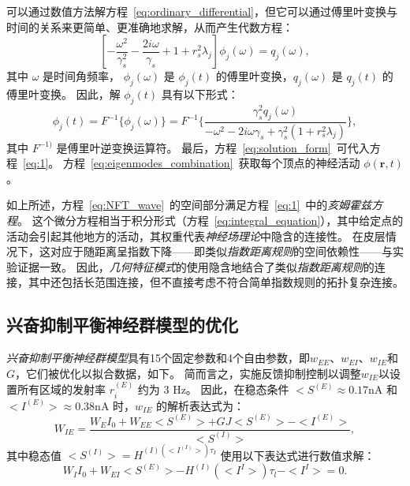 \documentclass[lang=cn,a4paper,newtx,citestyle=gb7714-2015, bibstyle=gb7714-2015]{elegantpaper}
\begin{document}
可以通过数值方法解方程~\ref{eq:ordinary_differential}，但它可以通过傅里叶变换与时间的关系来更简单、更准确地求解，从而产生代数方程：
%
\begin{equation}\label{eq:algebraic_equation}
	[
		- \frac{\omega ^2}{\gamma_s^2}
		- \frac{2 i \omega}{\gamma_s}
		+ 1
		+ r_s^2 \lambda_j
	]
	\phi_j(\omega)
	=
	q_j(\omega),
\end{equation}
%
其中 $ ω $ 是时间角频率， $ \phi_j (\omega) $ 是 $ \phi_j (t) $ 的傅里叶变换，$ q_j (\omega) $ 是 $ q_j (t) $ 的傅里叶变换。
因此，解 $ \phi_j (t) $ 具有以下形式：
%
\begin{equation}\label{eq:solution_form}
	\phi_j(t)
	=
	F^{-1} \{\phi_j(\omega)\}
	=
	F^{-1}
	\{
		\frac{
				\gamma_s^2 q_j(\omega)
			 }
		 	 {
		 	 	- \omega^2
		 	 	- 2 i \omega \gamma_s
		 	 	+ \gamma_s^2
		 	 		(1 + r_s^2 \lambda_j)
		 	 }
	\},
\end{equation}
%
其中 $ F^{-1)} $ 是傅里叶逆变换运算符。
最后，方程~\ref{eq:solution_form}~可代入方程~\ref{eq:1}。
方程~\ref{eq:eigenmodes_combination}~获取每个顶点的神经活动 $ \phi(\boldsymbol{r},t) $。



如上所述，方程~\ref{eq:NFT_wave}~的空间部分满足方程~\ref{eq:1}~中的\textit{亥姆霍兹方程}。
这个微分方程相当于积分形式（方程~\ref{eq:integral_equation}），其中给定点的活动会引起其他地方的活动，其权重代表\textit{神经场理论}中隐含的连接性。
在皮层情况下，这对应于随距离呈指数下降——即类似\textit{指数距离规则}的空间依赖性——与实验证据\cite{robinson1997propagation}一致。
因此，\textit{几何特征模式}的使用隐含地结合了类似\textit{指数距离规则}的连接，其中还包括长范围连接，但不直接考虑不符合简单指数规则的拓扑复杂连接。



\subsection{兴奋抑制平衡神经群模型的优化} \label{sec:mass_optimization}

\textit{兴奋抑制平衡}\textit{神经群模型}具有15个固定参数和4个自由参数，即$ w_{EE} $、$ w_{EI} $、$ w_{IE} $和 $ G $，它们被优化以拟合数据，如下\cite{rosen2022estimation}。
简而言之，实施反馈抑制控制\cite{van2012high}以调整$ w_{IE} $以设置所有区域的发射率 $ r_i^{(E)} $ 约为 3 Hz。
因此，在稳态条件 $ <S^{(E)} \approx 0.17 \text{nA} $ 和 $ <I^{(E)}> \approx 0.38 \text{nA} $ 时，$ w_{IE} $ 的解析表达式为：
%
\begin{equation}\label{eq:analytic_expression}
	W_{IE} = 
		\frac{
			W_E I_0 + W_{EE} <S^{(E)}> + GJ <S^{(E)}> - <I^{(E)}>
			}
			{
				<S^{(I)}>
			},
\end{equation}
%
其中稳态值 $ <S^{(I)}> = H^{(I) (<I^{(I)}>) \tau_I } $ 使用以下表达式进行数值求解：
%
\begin{equation}\label{eq:solved_expression}
	W_I I_0 
	+ W_{EI}<S^{(E)}> 
	- H^{(I)} (<I^{I}>) \tau_l
	- <I^{I}>
	= 0.
\end{equation}
\end{document}
